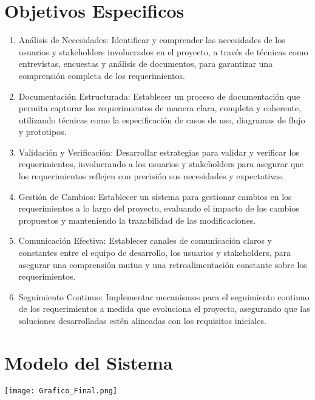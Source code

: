 \documentclass[11pt]{article}
\begin{document}
\section{Objetivos Especificos}
\begin{enumerate}
\item Análisis de Necesidades: Identificar y comprender las necesidades de los usuarios y stakeholders involucrados en el proyecto, a través de técnicas como entrevistas, encuestas y análisis de documentos, para garantizar una comprensión completa de los requerimientos.
\item Documentación Estructurada: Establecer un proceso de documentación que permita capturar los requerimientos de manera clara, completa y coherente, utilizando técnicas como la especificación de casos de uso, diagramas de flujo y prototipos.
\item Validación y Verificación: Desarrollar estrategias para validar y verificar los requerimientos, involucrando a los usuarios y stakeholders para asegurar que los requerimientos reflejen con precisión sus necesidades y expectativas.
\item Gestión de Cambios: Establecer un sistema para gestionar cambios en los requerimientos a lo largo del proyecto, evaluando el impacto de los cambios propuestos y manteniendo la trazabilidad de las modificaciones.
\item Comunicación Efectiva: Establecer canales de comunicación claros y constantes entre el equipo de desarrollo, los usuarios y stakeholders, para asegurar una comprensión mutua y una retroalimentación constante sobre los requerimientos.
\item Seguimiento Continuo: Implementar mecanismos para el seguimiento continuo de los requerimientos a medida que evoluciona el proyecto, asegurando que las soluciones desarrolladas estén alineadas con los requisitos iniciales. 
\end{enumerate}
\section{Modelo del Sistema}
\texttt{[image: Grafico\_Final.png]}
\end{document}
